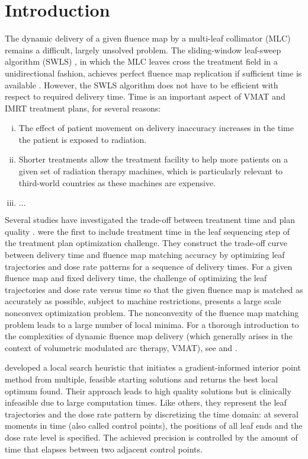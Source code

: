 \section{Introduction}
The dynamic delivery of a given fluence map by a multi-leaf collimator (MLC) remains a difficult, largely unsolved problem.
The sliding-window leaf-sweep algorithm (SWLS) \cite{leafsweep}, in which the MLC leaves cross the treatment field in a unidirectional fashion, achieves perfect fluence map replication if sufficient time is available \cite{Stein94}.
However, the SWLS algorithm does not have to be efficient with respect to required delivery time.
Time is an important aspect of VMAT and IMRT treatment plans, for several reasons:
\begin{enumerate}[i)]
  \item The effect of patient movement on delivery inaccuracy increases in the time the patient is exposed to radiation.
  \item Shorter treatments allow the treatment facility to help more patients on a given set of radiation therapy machines, which is particularly relevant to third-world countries as these machines are expensive.
  \item $\hdots$
\end{enumerate}
Several studies have investigated the trade-off between treatment time and plan quality \cite{tradeoffSalari,tradeoffMCO,tradeoffCraft}.
\cite{balvertcraft} were the first to include treatment time in the leaf sequencing step of the treatment plan optimization challenge.
They construct the trade-off curve between delivery time and fluence map matching accuracy by optimizing leaf trajectories and dose rate patterns for a sequence of delivery times.
For a given fluence map and fixed delivery time, the challenge of optimizing the leaf trajectories and dose rate versus time so that the given fluence map is matched as accurately as possible, subject to machine restrictions, presents a large scale nonconvex optimization problem.
The nonconvexity of the fluence map matching problem leads to a large number of local minima.
For a thorough introduction to the complexities of dynamic fluence map delivery (which generally arises in the context of volumetric modulated arc therapy, VMAT),
see \cite{balvertcraft} and \cite{unkvmatreview}.

\cite{balvertcraft} developed a local search heuristic that initiates a gradient-informed interior point method from multiple, feasible starting solutions and returns the best local optimum found.
Their approach leads to high quality solutions but is clinically infeasible due to large computation times.
Like others, they represent the leaf trajectories and the dose rate pattern by discretizing the time domain:
at several moments in time (also called control points), the positions of all leaf ends and the dose rate level is specified.
The achieved precision is controlled by the amount of time that elapses between two adjacent control points.

